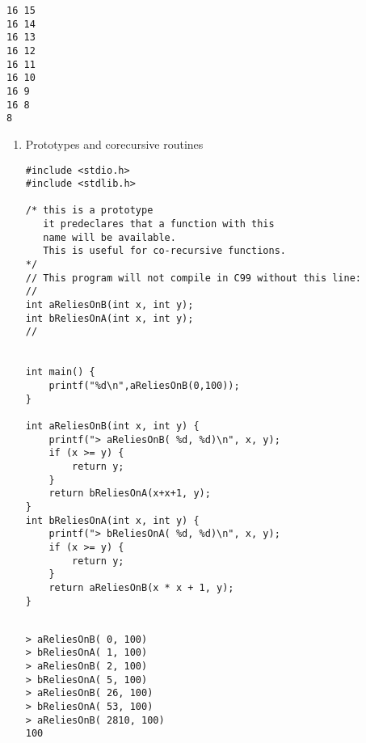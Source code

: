 \documentclass[11pt]{article}
\begin{document}
\begin{verbatim}
16 15
16 14
16 13
16 12
16 11
16 10
16 9
16 8
8
\end{verbatim}

\begin{enumerate}
\item Prototypes and corecursive routines
\label{sec:orgd77611f}

\begin{verbatim}
#include <stdio.h>
#include <stdlib.h>

/* this is a prototype
   it predeclares that a function with this
   name will be available.
   This is useful for co-recursive functions.
*/
// This program will not compile in C99 without this line:
// 
int aReliesOnB(int x, int y);
int bReliesOnA(int x, int y);
// 


int main() {
    printf("%d\n",aReliesOnB(0,100));
}

int aReliesOnB(int x, int y) {
    printf("> aReliesOnB( %d, %d)\n", x, y);
    if (x >= y) {
        return y;
    }
    return bReliesOnA(x+x+1, y);
}
int bReliesOnA(int x, int y) {
    printf("> bReliesOnA( %d, %d)\n", x, y);
    if (x >= y) {
        return y;
    }
    return aReliesOnB(x * x + 1, y);
}


\end{verbatim}

\begin{verbatim}
> aReliesOnB( 0, 100)
> bReliesOnA( 1, 100)
> aReliesOnB( 2, 100)
> bReliesOnA( 5, 100)
> aReliesOnB( 26, 100)
> bReliesOnA( 53, 100)
> aReliesOnB( 2810, 100)
100
\end{verbatim}
\end{enumerate}
\end{document}
